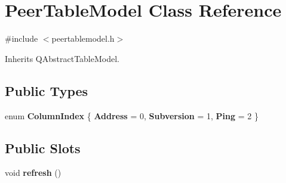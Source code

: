 \hypertarget{class_peer_table_model}{}\section{Peer\+Table\+Model Class Reference}
\label{class_peer_table_model}


{\ttfamily \#include $<$peertablemodel.\+h$>$}



Inherits Q\+Abstract\+Table\+Model.

\subsection*{Public Types}
\begin{DoxyCompactItemize}
\item 
\mbox{\label{class_peer_table_model_a10a32ec5f31c9765c80b611760f7e590}} 
enum {\bfseries Column\+Index} \{ {\bfseries Address} = 0, 
{\bfseries Subversion} = 1, 
{\bfseries Ping} = 2
 \}
\end{DoxyCompactItemize}
\subsection*{Public Slots}
\begin{DoxyCompactItemize}
\item 
\mbox{\label{class_peer_table_model_abae14b3fd8a38a60f752f67a57b5b0b3}} 
void {\bfseries refresh} ()
\end{DoxyCompactItemize}

